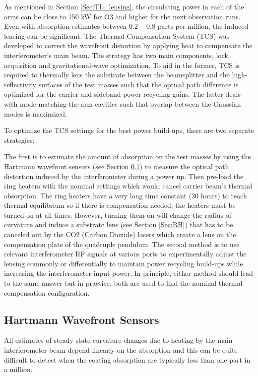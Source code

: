 	As mentioned in Section \ref{Sec:TL_lensing}, the circulating power in each of the arms can be close to 150 kW for O3 and higher for the next observation runs.  Even with absorption estimates between $0.2-0.8$ parts per million, the induced lensing can be significant.  The Thermal Compensation System (TCS) \cite{Lawrence_TCS} \cite{AWC_current} was developed to correct the wavefront distortion by applying heat to compensate the interferometer's main beam.  The strategy has two main components, lock acquisition and gravitational-wave optimization.  To aid in the former, TCS is required to thermally lens the substrate between the beamsplitter and the high-reflectivity surfaces of the test masses such that the optical path difference is optimized for the carrier and sideband power recycling gains.  The latter deals with mode-matching the arm cavities such that overlap between the Gaussian modes is maximized.
	
	To optimize the TCS settings for the best power build-ups, there are two separate strategies:  
	
	The first is to estimate the amount of absorption on the test masses by using the Hartmann wavefront sensors (see Section \ref{Sec:HWS}) to measure the optical path distortion induced by the interferometer during a power up.  Then pre-load the ring heaters with the nominal settings which would cancel carrier beam's thermal absorption.  The ring heaters have a very long time constant (30 hours) to reach thermal equilibrium so if there is compensation needed, the heaters must be turned on at all times.    However, turning them on will change the radius of curvature and induce a substrate lens (see Section \ref{Sec:RH}) that has to be canceled out by the CO2 (Carbon Dioxide) lasers which create a lens on the compensation plate of the quadruple pendulum. The second method is to use relevant interferometer RF signals at various ports to experimentally adjust the lensing commonly or differentially to maintain power recycling build-ups while increasing the interferometer input power.  In principle, either method should lead to the same answer but in practice, both are used to find the nominal thermal compensation configuration.

	\subsection{Hartmann Wavefront Sensors}\label{Sec:HWS}
	All estimates of steady-state curvature changes due to heating by the main interferometer beam depend linearly on the absorption and this can be quite difficult to detect when the coating absorption are typically less than one part in a million.
	
